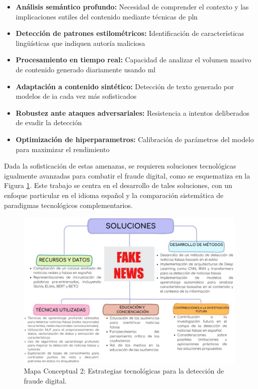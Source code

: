 \begin{itemize}
    \item \textbf{Análisis semántico profundo:} Necesidad de comprender el contexto y las implicaciones sutiles del contenido mediante técnicas de \gls{pln}
    \item \textbf{Detección de patrones estilométricos:} Identificación de características lingüísticas que indiquen autoría maliciosa \cite{tsai2023stylometric}
    \item \textbf{Procesamiento en tiempo real:} Capacidad de analizar el volumen masivo de contenido generado diariamente usando \gls{ml}
    \item \textbf{Adaptación a contenido sintético:} Detección de texto generado por modelos de \gls{ia} cada vez más sofisticados \cite{su2023adapting}
    \item \textbf{Robustez ante ataques adversariales:} Resistencia a intentos deliberados de evadir la detección
    \item \textbf{Optimización de \glspl{hiperparametro}:} Calibración de parámetros del modelo para maximizar el rendimiento
\end{itemize}

Dada la sofisticación de estas amenazas, se requieren soluciones tecnológicas igualmente avanzadas para combatir el fraude digital, como se esquematiza en la Figura \ref{fig:mapa_soluciones}. Este trabajo se centra en el desarrollo de tales soluciones, con un enfoque particular en el idioma español y la comparación sistemática de paradigmas tecnológicos complementarios.

\begin{figure}[h!]
    \centering
    \includegraphics[width=\textwidth]{Imagenes/mapaConceptual2.png}
    \caption{Mapa Conceptual 2: Estrategias tecnológicas para la detección de fraude digital.}
    \label{fig:mapa_soluciones}
\end{figure}

